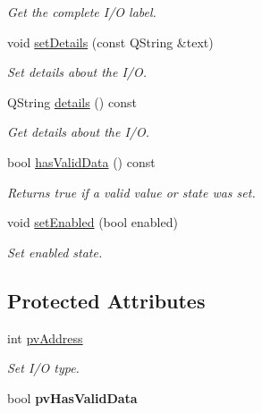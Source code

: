 \begin{DoxyCompactItemize}
\begin{DoxyCompactList}\small\item\em Get the complete I/O label. \end{DoxyCompactList}\item 
\hypertarget{classmdt_abstract_io_a9844c14b0e64858c62604039681ab885}{
void \hyperlink{classmdt_abstract_io_a9844c14b0e64858c62604039681ab885}{setDetails} (const QString \&text)}
\label{classmdt_abstract_io_a9844c14b0e64858c62604039681ab885}

\begin{DoxyCompactList}\small\item\em Set details about the I/O. \end{DoxyCompactList}\item 
\hypertarget{classmdt_abstract_io_a6e0b36f1563a045a23417145290fdf41}{
QString \hyperlink{classmdt_abstract_io_a6e0b36f1563a045a23417145290fdf41}{details} () const }
\label{classmdt_abstract_io_a6e0b36f1563a045a23417145290fdf41}

\begin{DoxyCompactList}\small\item\em Get details about the I/O. \end{DoxyCompactList}\item 
\hypertarget{classmdt_abstract_io_a61d96045087fe92a0b455693970b1e76}{
bool \hyperlink{classmdt_abstract_io_a61d96045087fe92a0b455693970b1e76}{hasValidData} () const }
\label{classmdt_abstract_io_a61d96045087fe92a0b455693970b1e76}

\begin{DoxyCompactList}\small\item\em Returns true if a valid value or state was set. \end{DoxyCompactList}\item 
\hypertarget{classmdt_abstract_io_a64f31b1d9abdec6d0b0cc05a2fe1f31b}{
void \hyperlink{classmdt_abstract_io_a64f31b1d9abdec6d0b0cc05a2fe1f31b}{setEnabled} (bool enabled)}
\label{classmdt_abstract_io_a64f31b1d9abdec6d0b0cc05a2fe1f31b}

\begin{DoxyCompactList}\small\item\em Set enabled state. \end{DoxyCompactList}\end{DoxyCompactItemize}
\subsection*{Protected Attributes}
\begin{DoxyCompactItemize}
\item 
int \hyperlink{classmdt_abstract_io_a45f50dbd2bafc248428e59f2c4c6272b}{pvAddress}
\begin{DoxyCompactList}\small\item\em Set I/O type. \end{DoxyCompactList}\item 
\hypertarget{classmdt_abstract_io_ac7d552a8474559cac50488bd14891ce3}{
bool {\bfseries pvHasValidData}}
\label{classmdt_abstract_io_ac7d552a8474559cac50488bd14891ce3}

\end{DoxyCompactItemize}


